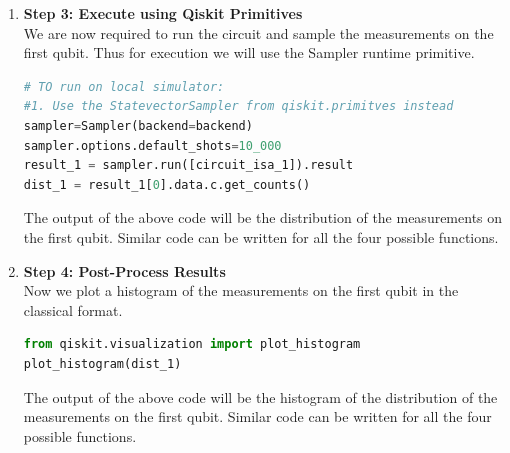 \documentclass[12pt, oneside]{book}
\theoremstyle{definition}
\theoremstyle{definition}
\theoremstyle{remark}
\begin{document}
\begin{enumerate}
    \item \textbf{Step 3: Execute using Qiskit Primitives}\\

    We are now required to run the circuit and sample the measurements on the first qubit. Thus for execution we will use the Sampler runtime primitive.
    \begin{lstlisting}[language=Python]
# TO run on local simulator:
#1. Use the StatevectorSampler from qiskit.primitves instead
sampler=Sampler(backend=backend)
sampler.options.default_shots=10_000
result_1 = sampler.run([circuit_isa_1]).result
dist_1 = result_1[0].data.c.get_counts()   
    \end{lstlisting}
    The output of the above code will be the distribution of the measurements on the first qubit. Similar code can be written for all the four possible functions.

    \item \textbf{Step 4: Post-Process Results}\\
    Now we plot a histogram of the measurements on the first qubit in the classical format.
    \begin{lstlisting}[language=Python]
from qiskit.visualization import plot_histogram
plot_histogram(dist_1)
    \end{lstlisting}
    The output of the above code will be the histogram of the distribution of the measurements on the first qubit. Similar code can be written for all the four possible functions.


\end{enumerate}
\end{document}
